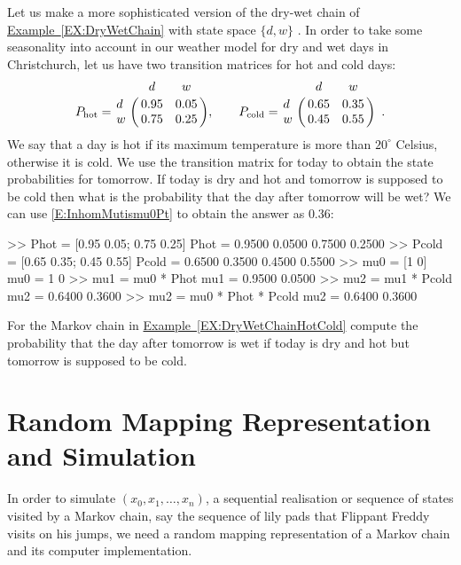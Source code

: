 \begin{example}\label{EX:DryWetChainHotCold}
Let us make a more sophisticated version of the dry-wet chain of \hyperref[EX:DryWetChain]{Example~\ref*{EX:DryWetChain}} with state space $\{d,w\}$ .  In order to take some seasonality into account in our weather model for dry and wet days in Christchurch, let us have two transition matrices for hot and cold days:
\[
P_{\text{hot}} = 
\bordermatrix{~ & d & w \cr
d & 0.95 & 0.05 \cr
w & 0.75 & 0.25},
\qquad
P_{\text{cold}} = 
\bordermatrix{~ & d & w \cr
d & 0.65 & 0.35 \cr
w & 0.45 & 0.55} \enspace .
\]
We say that a day is hot if its  maximum temperature is more than $20^{\circ}$ Celsius, otherwise it is cold.  We use the transition matrix for today to obtain the state probabilities for tomorrow.  If today is dry and hot and tomorrow is supposed to be cold then what is the probability that the day after tomorrow will be wet?  We can use \eqref{E:InhomMutismu0Pt} to obtain the answer as $0.36$: 
\begin{VrbM}
>> Phot = [0.95 0.05; 0.75 0.25] %
Phot =
    0.9500    0.0500
    0.7500    0.2500
>> Pcold = [0.65 0.35; 0.45 0.55] %
Pcold =
    0.6500    0.3500
    0.4500    0.5500
>> mu0 = [1 0] %
mu0 =     1     0
>> mu1 = mu0 * Phot %
mu1 =    0.9500    0.0500
>> mu2 = mu1 * Pcold %
mu2 =    0.6400    0.3600
>> mu2 = mu0 * Phot * Pcold %
mu2 =    0.6400    0.3600
\end{VrbM}
\end{example}

\begin{exercise}\label{Exr:DryWetChainHotCold}
For the Markov chain in \hyperref[EX:DryWetChainHotCold]{Example~\ref*{EX:DryWetChainHotCold}}  compute the probability that the day after tomorrow is wet if today is dry and hot but tomorrow is supposed to be cold.
\end{exercise}

\section{Random Mapping Representation and Simulation}\label{S:FiniteMCRMRandSim}

In order to simulate $(x_0,x_1,\ldots,x_n)$, a sequential realisation or sequence of states visited by a Markov chain, say the sequence of lily pads that Flippant Freddy visits on his jumps, we need a random mapping representation of a Markov chain and its computer implementation.  

